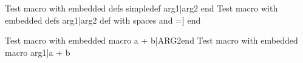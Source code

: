 \documentclass{article}
\author{Macro Arg Embedded Test}
\begin{document}
	Test macro with embedded defs simpledef arg1|arg2 end
	Test macro with embedded defs arg1|arg2 def with spaces and =]{} end

	Test macro with embedded macro a + b|ARG2end
	Test macro with embedded macro arg1|{a + b}\test
\end{document}
